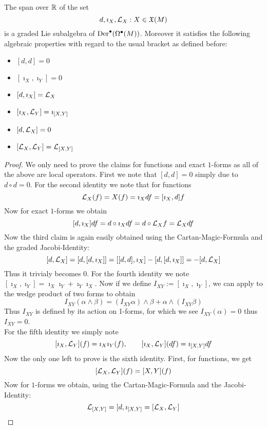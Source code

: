 \begin{prop}
  The span over $\mathbb{R}$ of the set
  $$ {d, \imath_X, \mathcal{L}_{X}: X \in \mathfrak{X}(M)} $$
  is a graded Lie subalgebra of $\operatorname{Der}^\bullet(\Omega^\bullet(M))$. Moreover it satisfies the following algebraic properties with regard to the usual bracket as defined before:
  \begin{multicols}{3}
    \begin{itemize}
      \item[(1)] $[d,d] = 0$
      \item[(4)] $[\imath_X, \imath_Y] = 0$
      \item[(2)] $[d, \imath_X] = \mathcal{L}_{X}$
      \item[(5)] $[\imath_X, \mathcal{L}_{Y}] = \imath_{[X,Y]}$
      \item[(3)] $[d, \mathcal{L}_{X}] = 0$
      \item[(6)] $[\mathcal{L}_{X}, \mathcal{L}_{Y}] = \mathcal{L}_{[X,Y]}$
    \end{itemize}
\end{multicols}
  \begin{proof}
    We only need to prove the claims for functions and exact $1$-forms as all of the above are local operators. First we note that $[d,d]=0$ simply due to $d \circ d = 0$. For the second identity we note that for functions
    $$ \mathcal{L}_{X}(f) = X(f) = \imath_X df = [\imath_X, d]f $$
    Now for exact $1$-forms we obtain
    $$ [d, \imath_X] df = d\circ \imath_X df = d \circ \mathcal{L}_{X}f = \mathcal{L}_{X} df $$
    Now the third claim is again easily obtained using the Cartan-Magic-Formula and the graded Jacobi-Identity:
    $$ [d, \mathcal{L}_{X}] = [d,[d,\imath_X]] = [[d,d],\imath_X] - [d,[d,\imath_X]] = - [d, \mathcal{L}_{X}]$$
    Thus it trivialy becomes $0$. For the fourth identity we note $[\imath_X, \imath_Y] = \imath_X \imath_Y + \imath_Y \imath_X$. Now if we define $I_{XY} := [\imath_X, \imath_Y]$, we can apply to the wedge product of two forms to obtain
    $$ I_{XY} (\alpha \wedge \beta) = (I_{XY}\alpha) \wedge \beta +  \alpha \wedge (I_{XY}\beta) $$
    Thus $I_{XY}$ is defined by its action on 1-forms, for which we see $I_{XY}(\alpha) = 0$ thus $I_{XY} =0$.\\
    For the fifth identity we simply note
    $$ [\imath_X, \mathcal{L}_{Y}](f) = \imath_X \imath_Y (f), \quad \quad [\imath_X, \mathcal{L}_{Y}](df) = \imath_{[X,Y]} df $$
    Now the only one left to prove is the sixth identity. First, for functions, we get
    $$ [\mathcal{L}_{X}, \mathcal{L}_{Y}] (f) = [X,Y](f) $$
    Now for $1$-forms we obtain, using the Cartan-Magic-Formula and the Jacobi-Identity:
    $$ \mathcal{L}_{[X,Y]} = [d, \imath_{[X,Y]} = [\mathcal{L}_{X}, \mathcal{L}_{Y}]$$
  \end{proof}
\end{prop}

